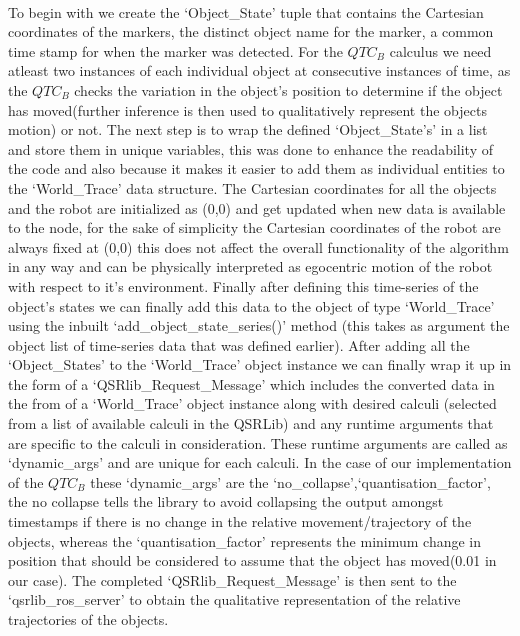 \paragraph{}To begin with we create the `Object\_State' tuple that contains the Cartesian coordinates of the markers, the distinct object name for the marker, a common time stamp for when the marker was detected. For the $QTC_B$ calculus we need atleast two instances of each individual object at consecutive instances of time, as the $QTC_B$ checks the variation in the object's position to determine if the object has moved(further inference is then used to qualitatively represent the objects motion) or not. The next step is to wrap the defined `Object\_State's' in a list and store them in unique variables, this was done to enhance the readability of the code and also because it makes it easier to add them as individual entities to the `World\_Trace' data structure. The Cartesian coordinates for all the objects and the robot are initialized as (0,0) and get updated when new data is available to the node, for the sake of simplicity the Cartesian coordinates of the robot are always fixed at (0,0) this does not affect the overall functionality of the algorithm in any way and can be physically interpreted as egocentric motion of the robot with respect to it's environment. Finally after defining this time-series of the object's states we can finally add this data to the object of type `World\_Trace' using the inbuilt `add\_object\_state\_series()' method (this takes as argument the object list of time-series data that was defined earlier). After adding all the `Object\_States' to the `World\_Trace' object instance we can finally wrap it up in the form of a `QSRlib\_Request\_Message' which includes the converted data in the from of a `World\_Trace' object instance along with desired calculi (selected from a list of available calculi in the QSRLib) and any runtime arguments that are specific to the calculi in  consideration. These runtime arguments are called as `dynamic\_args' and are unique for each calculi. In the case of our implementation of the $QTC_B$ these `dynamic\_args' are the `no\_collapse',`quantisation\_factor', the no collapse tells the library to avoid collapsing the output amongst timestamps if there is no change in the relative movement/trajectory of the objects, whereas the `quantisation\_factor' represents the minimum change in position that should be considered to assume that the object has moved(0.01 in our case). The completed `QSRlib\_Request\_Message' is then sent to the `qsrlib\_ros\_server' to obtain the qualitative representation of the relative trajectories of the objects.

